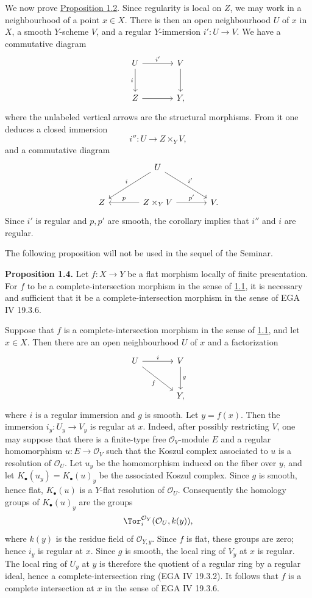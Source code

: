 We now prove \hyperlink{sga6.e08.prop.1-2}{Proposition 1.2}. Since regularity is local on $Z$, we may work in a neighbourhood of a point $x\in X$. There is then an open neighbourhood $U$ of $x$ in $X$, a smooth $Y$-scheme $V$, and a regular $Y$-immersion $i':U\to V$. We have a commutative diagram
\[
\begin{tikzcd}[column sep=large,row sep=large]
U \arrow[r,"i'"] \arrow[d,"i"'] & V \arrow[d]\\
Z \arrow[r] & Y,
\end{tikzcd}
\]
where the unlabeled vertical arrows are the structural morphisms. From it one deduces a closed immersion
\[
i'':U\longrightarrow Z\times_Y V,
\]
and a commutative diagram
\[
\begin{tikzcd}[column sep=large,row sep=large]
& U \arrow[dl,"i"'] \arrow[dr,"i'"] &\\
Z & Z\times_Y V \arrow[l,"p"'] \arrow[r,"p'"] & V.
\end{tikzcd}
\]
Since $i'$ is regular and $p,p'$ are smooth, the corollary implies that $i''$ and $i$ are regular.

The following proposition will not be used in the sequel of the Seminar.

\textbf{Proposition 1.4.} Let $f:X\to Y$ be a flat morphism locally of finite presentation. For $f$ to be a complete-intersection morphism in the sense of \hyperlink{sga6.e08.def.1-1}{1.1}, it is necessary and sufficient that it be a complete-intersection morphism in the sense of EGA IV 19.3.6.

Suppose that $f$ is a complete-intersection morphism in the sense of \hyperlink{sga6.e08.def.1-1}{1.1}, and let $x\in X$. Then there are an open neighbourhood $U$ of $x$ and a factorization
\[
\begin{tikzcd}[column sep=large,row sep=large]
U \arrow[r,"i"] \arrow[dr,"f"'] & V \arrow[d,"g"]\\
& Y,
\end{tikzcd}
\]
where $i$ is a regular immersion and $g$ is smooth. Let $y=f(x)$. Then the immersion $i_y:U_y\to V_y$ is regular at $x$. Indeed, after possibly restricting $V$, one may suppose that there is a finite-type free $\mathcal O_V$-module $E$ and a regular homomorphism $u:E\to\mathcal O_V$ such that the Koszul complex associated to $u$ is a resolution of $\mathcal O_U$. Let $u_y$ be the homomorphism induced on the fiber over $y$, and let $K_\bullet(u_y)=K_\bullet(u)_y$ be the associated Koszul complex. Since $g$ is smooth, hence flat, $K_\bullet(u)$ is a $Y$-flat resolution of $\mathcal O_U$. Consequently the homology groups of $K_\bullet(u)_y$ are the groups
\[
\Tor_i^{\mathcal O_Y}(\mathcal O_U,k(y)),
\]
where $k(y)$ is the residue field of $\mathcal O_{Y,y}$. Since $f$ is flat, these groups are zero; hence $i_y$ is regular at $x$. Since $g$ is smooth, the local ring of $V_y$ at $x$ is regular. The local ring of $U_y$ at $y$ is therefore the quotient of a regular ring by a regular ideal, hence a complete-intersection ring (EGA IV 19.3.2). It follows that $f$ is a complete intersection at $x$ in the sense of EGA IV 19.3.6.

